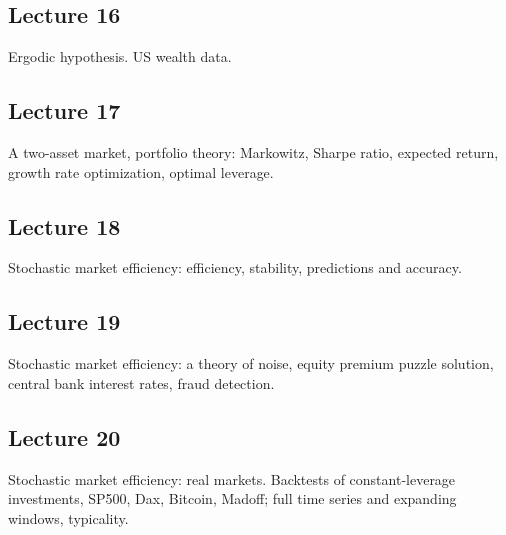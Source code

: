 \documentclass[12pt,a4paper]{article}
\begin{document}
\subsection*{Lecture 16}
Ergodic hypothesis. US wealth data.

\subsection*{Lecture 17}
A two-asset market, portfolio theory: Markowitz, Sharpe ratio, expected return, growth rate optimization, optimal leverage.

\subsection*{Lecture 18}
Stochastic market efficiency: efficiency, stability, predictions and accuracy.

\subsection*{Lecture 19}
Stochastic market efficiency: a theory of noise, equity premium puzzle solution, central bank interest rates, fraud detection.

\subsection*{Lecture 20}
Stochastic market efficiency: real markets. Backtests of constant-leverage investments, SP500, Dax, Bitcoin, Madoff; full time series and expanding windows, typicality.
\end{document}
